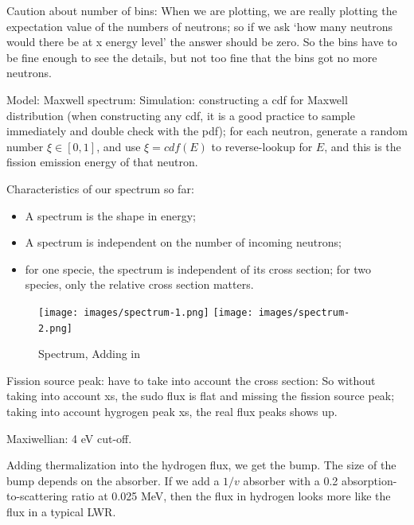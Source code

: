 \documentclass{school-22.211-notes}
\begin{document}
Caution about number of bins: When we are plotting, we are really plotting the expectation value of the numbers of neutrons; so if we ask `how many neutrons would there be at x energy level' the answer should be zero. So the bins have to be fine enough to see the details, but not too fine that the bins got no more neutrons. 

Model: Maxwell spectrum:
Simulation: constructing a cdf for Maxwell distribution (when constructing any cdf, it is a good practice to sample immediately and double check with the pdf); for each neutron, generate a random number $\xi \in [0,1]$, and use $\xi = cdf(E)$ to reverse-lookup for $E$, and this is the fission emission energy of that neutron. 

Characteristics of our spectrum so far: 
\begin{itemize}
\item A spectrum is the shape in energy;
\item A spectrum is independent on the number of incoming neutrons; 
\item for one specie, the spectrum is independent of its cross section; for two species, only the relative cross section matters. 
\end{itemize}

\begin{figure}
  \centering
  \texttt{[image: images/spectrum-1.png]}
  \texttt{[image: images/spectrum-2.png]}
  \caption{Spectrum, Adding in } \label{spe1}
\end{figure}

Fission source peak: have to take into account the cross section: 
So without taking into account xs, the sudo flux is flat and missing the fission source peak; taking into account hygrogen peak xs, the real flux peaks shows up. 


Maxiwellian: 4 eV cut-off. 


Adding thermalization into the hydrogen flux, we get the bump. The size of the bump depends on the absorber. If we add a $1/v$ absorber with a 0.2 absorption-to-scattering ratio at 0.025 MeV, then the flux in hydrogen looks more like the flux in a typical LWR. 
\end{document}
